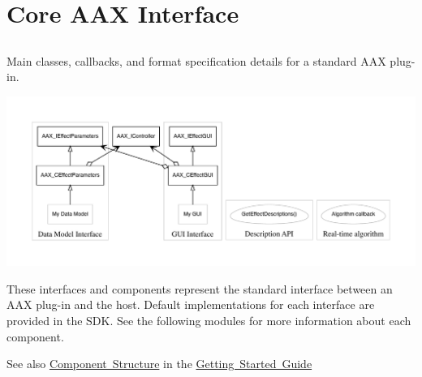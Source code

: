 \hypertarget{a00795}{}\section{Core A\+AX Interface}
\label{a00795}


\subsection{ }
Main classes, callbacks, and format specification details for a standard A\+AX plug-\/in. 


\begin{DoxyImage}
\includegraphics[width=\textwidth,height=\textheight/2,keepaspectratio=true]{dot_maininterface}
\end{DoxyImage}
 These interfaces and components represent the standard interface between an A\+AX plug-\/in and the host. Default implementations for each interface are provided in the S\+DK. See the following modules for more information about each component.

\begin{DoxySeeAlso}{See also}
\mbox{\hyperlink{a00794_subsection__component_structure}{Component Structure}} in the \mbox{\hyperlink{a00794}{Getting Started Guide}} 
\end{DoxySeeAlso}
